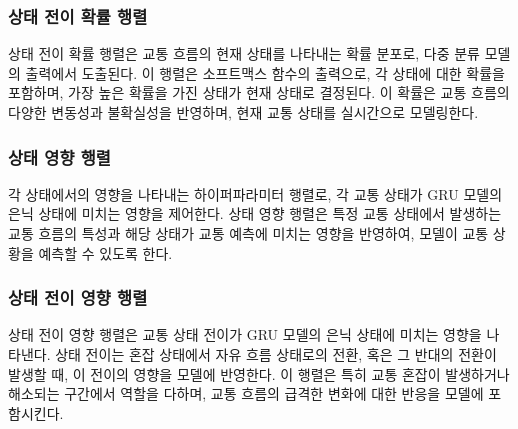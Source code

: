 \documentclass[11pt]{report}
\begin{document}
\subsubsection*{상태 전이 확률 행렬}
상태 전이 확률 행렬은 교통 흐름의 현재 상태를 나타내는 확률 분포로, 다중 분류 모델의 출력에서 도출된다. 
이 행렬은 소프트맥스 함수의 출력으로, 각 상태에 대한 확률을 포함하며, 가장 높은 확률을 가진 상태가 현재 상태로 결정된다. 
이 확률은 교통 흐름의 다양한 변동성과 불확실성을 반영하며, 현재 교통 상태를 실시간으로 모델링한다. \\
\subsubsection*{상태 영향 행렬}
각 상태에서의 영향을 나타내는 하이퍼파라미터 행렬로, 각 교통 상태가 GRU 모델의 은닉 상태에 미치는 영향을 제어한다. 
상태 영향 행렬은 특정 교통 상태에서 발생하는 교통 흐름의 특성과 해당 상태가 교통 예측에 미치는 영향을 반영하여, 모델이 교통 상황을 예측할 수 있도록 한다. 
\subsubsection*{상태 전이 영향 행렬}
상태 전이 영향 행렬은 교통 상태 전이가 GRU 모델의 은닉 상태에 미치는 영향을 나타낸다. 
상태 전이는 혼잡 상태에서 자유 흐름 상태로의 전환, 혹은 그 반대의 전환이 발생할 때, 이 전이의 영향을 모델에 반영한다. 
이 행렬은 특히 교통 혼잡이 발생하거나 해소되는 구간에서 역할을 다하며, 교통 흐름의 급격한 변화에 대한 반응을 모델에 포함시킨다. 
\end{document}
